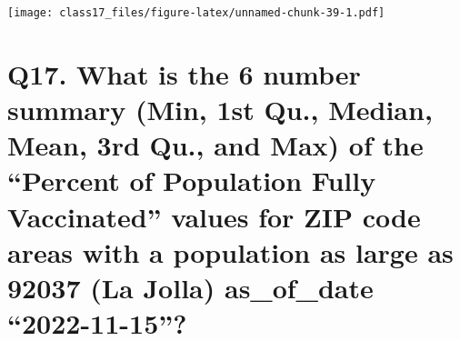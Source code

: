 \documentclass[
]{article}
\newenvironment{Shaded}{\begin{snugshade}}{\end{snugshade}}
\newcommand{\AttributeTok}[1]{\textcolor[rgb]{0.77,0.63,0.00}{#1}}
\newcommand{\DecValTok}[1]{\textcolor[rgb]{0.00,0.00,0.81}{#1}}
\newcommand{\FloatTok}[1]{\textcolor[rgb]{0.00,0.00,0.81}{#1}}
\newcommand{\FunctionTok}[1]{\textcolor[rgb]{0.00,0.00,0.00}{#1}}
\newcommand{\NormalTok}[1]{#1}
\newcommand{\SpecialCharTok}[1]{\textcolor[rgb]{0.00,0.00,0.00}{#1}}
\newcommand{\StringTok}[1]{\textcolor[rgb]{0.31,0.60,0.02}{#1}}
\begin{document}
\begin{Shaded}
\end{Shaded}

\texttt{[image: class17\_files/figure-latex/unnamed-chunk-39-1.pdf]}

\hypertarget{q17.-what-is-the-6-number-summary-min-1st-qu.-median-mean-3rd-qu.-and-max-of-the-percent-of-population-fully-vaccinated-values-for-zip-code-areas-with-a-population-as-large-as-92037-la-jolla-as_of_date-2022-11-15}{%
\section{Q17. What is the 6 number summary (Min, 1st Qu., Median, Mean,
3rd Qu., and Max) of the ``Percent of Population Fully Vaccinated''
values for ZIP code areas with a population as large as 92037 (La Jolla)
as\_of\_date
``2022-11-15''?}\label{q17.-what-is-the-6-number-summary-min-1st-qu.-median-mean-3rd-qu.-and-max-of-the-percent-of-population-fully-vaccinated-values-for-zip-code-areas-with-a-population-as-large-as-92037-la-jolla-as_of_date-2022-11-15}}

\begin{Shaded}
\end{Shaded}
\end{document}
